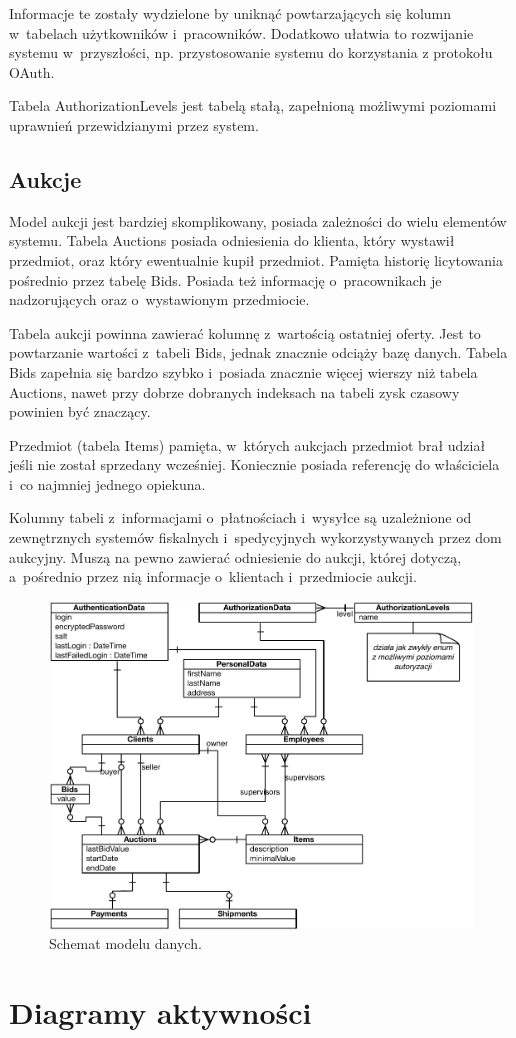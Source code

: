 \documentclass[10pt,a4paper]{article}
\newcommand{\s}[1]{\textsf{#1}}
\begin{document}
Informacje te zostały wydzielone by uniknąć powtarzających się kolumn
w~tabelach użytkowników i~pracowników. Dodatkowo ułatwia to rozwijanie systemu
w~przyszłości, np. przystosowanie systemu do korzystania z protokołu OAuth.

Tabela \s{AuthorizationLevels} jest tabelą stałą, zapełnioną możliwymi
poziomami uprawnień przewidzianymi przez system.

\subsection{Aukcje}

Model aukcji jest bardziej skomplikowany, posiada zależności do wielu elementów
systemu. Tabela \s{Auctions} posiada odniesienia do klienta, który wystawił
przedmiot, oraz który ewentualnie kupił przedmiot. Pamięta historię licytowania
pośrednio przez tabelę \s{Bids}. Posiada też informację o~pracownikach je
nadzorujących oraz o~wystawionym przedmiocie.

Tabela aukcji powinna zawierać kolumnę z~wartością ostatniej oferty. Jest to
powtarzanie wartości z~tabeli \s{Bids}, jednak znacznie odciąży bazę danych.
Tabela \s{Bids} zapełnia się bardzo szybko i~posiada znacznie więcej wierszy
niż tabela \s{Auctions}, nawet przy dobrze dobranych indeksach na tabeli zysk
czasowy powinien być znaczący.

Przedmiot (tabela \s{Items}) pamięta, w~których aukcjach przedmiot brał udział
jeśli nie został sprzedany wcześniej. Koniecznie posiada referencję do
właściciela i~co najmniej jednego opiekuna.

Kolumny tabeli z~informacjami o~płatnościach i~wysyłce są uzależnione od
zewnętrznych systemów fiskalnych i~spedycyjnych wykorzystywanych przez dom
aukcyjny. Muszą na pewno zawierać odniesienie do aukcji, której dotyczą,
a~pośrednio przez nią informacje o~klientach i~przedmiocie aukcji.

\begin{figure}[p]
  \begin{adjustwidth}{-2cm}{-2cm}
    \centering
    \includegraphics{figury/model-danych}
    \caption{Schemat modelu danych.}
    \label{fig:model_danych}
  \end{adjustwidth}
\end{figure}

\section{Diagramy aktywności}
\end{document}
